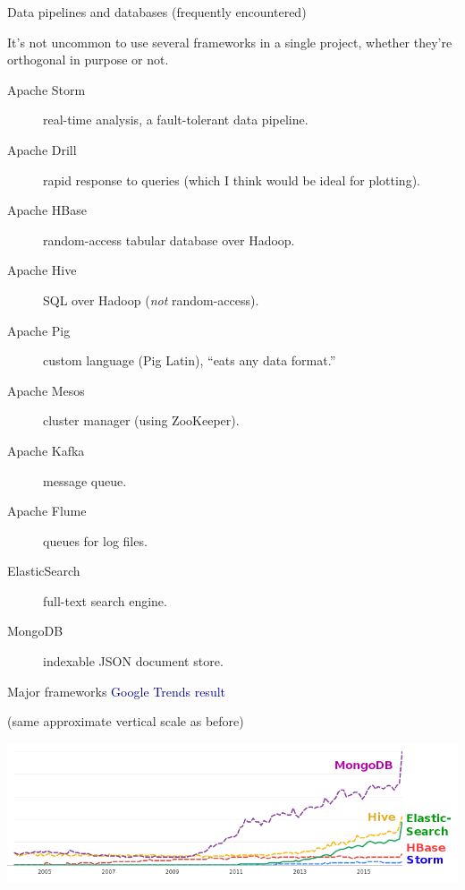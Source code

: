 \documentclass{beamer}
\begin{document}
\begin{frame}{Data pipelines and databases (frequently encountered)}

It's not uncommon to use several frameworks in a single project, whether they're orthogonal in purpose or not.

\begin{description}
\item[Apache Storm] real-time analysis, a fault-tolerant data pipeline.
\item[Apache Drill] rapid response to queries (which I think would be ideal for plotting).
\item[Apache HBase] random-access tabular database over Hadoop.
\item[Apache Hive] SQL over Hadoop ({\it not} random-access).
\item[Apache Pig] custom language (Pig Latin), ``eats any data format.''
\item[Apache Mesos] cluster manager (using ZooKeeper).
\item[Apache Kafka] message queue.
\item[Apache Flume] queues for log files.
\item[ElasticSearch] full-text search engine.
\item[MongoDB] indexable JSON document store.
\end{description}
\end{frame}

\begin{frame}{Major frameworks}
\textcolor{darkblue}{Google Trends result}

(same approximate vertical scale as before)

\includegraphics[width=\linewidth]{trends2.png}
\end{frame}
\end{document}
